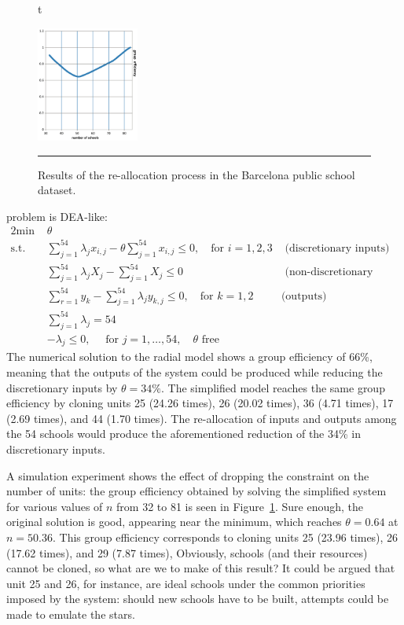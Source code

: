 \begin{figure}{t}
  \begin{center}
    \includegraphics[width=0.3\textwidth]{Images/optimalefficiency}
  \end{center}
  \caption{\small Results of the re-allocation process in the Barcelona public school dataset.}\hrule
  \label{fig:overall}
\end{figure}
 problem is DEA-like:
\begin{alignat*}{2}
    \text{min }   & \theta & &\  \\
    \text{s.t. } & \sum_{j=1}^{54} \lambda_{j}x_{i,j}-\theta \sum_{j=1}^{54}x_{i,j} \leq 0,  \quad\text{for }i=1,2,3 & \text{ (discretionary inputs)}& \\
    & \sum_{j=1}^{54} \lambda_{j}X_{j}- \sum_{j=1}^{54}X_j \leq 0  &\text{ (non-discretionary input)} & \\
                       & \sum_{r=1}^{54}y_{k}-\sum_{j=1}^{54} \lambda_{j}y_{k,j}\leq 0, \quad \text{for }k=1,2 & \text{(outputs)}\\
                       & \sum_{j=1}^{54}\lambda_{j}=54 &  &\\
                       & -\lambda_{j}\leq 0, \quad\text{ for }j=1,\ldots,54, \quad \theta \text{ free} & & 
  \end{alignat*}
The numerical solution to the radial model shows a group efficiency of 66\%, meaning that the outputs of the system could be produced while reducing the discretionary inputs by $\theta=34\%$. The simplified model reaches the same group efficiency by cloning units 25 (24.26 times), 26 (20.02 times), 36 (4.71 times), 17 (2.69 times), and 44 (1.70 times). The re-allocation of inputs and outputs among the 54 schools would produce the aforementioned reduction of the 34\% in discretionary inputs.\par 
A simulation experiment shows the effect of dropping the constraint on the number of units: the group efficiency obtained by solving the simplified system for various values of $n$ from 32 to 81 is seen in Figure~\ref{fig:overall}. Sure enough, the original solution is good, appearing near the minimum, which reaches $\theta=0.64$ at $n = 50.36$. This group efficiency corresponds to cloning units 25 (23.96 times), 26 (17.62 times), and 29 (7.87 times), Obviously, schools (and their resources) cannot be cloned, so what are we to make of this result?  It could be argued that unit 25 and 26, for instance, are ideal schools under the common priorities imposed by the system: should new schools have to be built, attempts could be made to emulate the stars.

